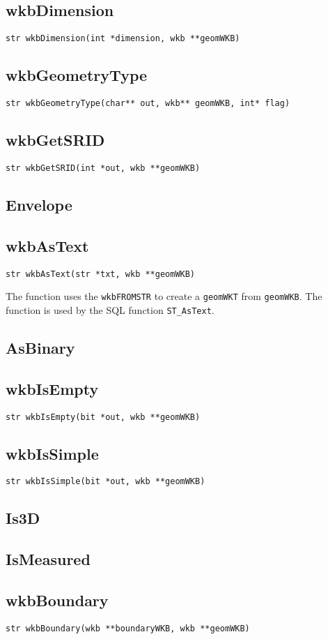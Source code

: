 \documentclass{article}
\begin{document}
\subsection{wkbDimension}

{\tt str wkbDimension(int *dimension, wkb **geomWKB)}

\subsection{wkbGeometryType}

{\tt str wkbGeometryType(char** out, wkb** geomWKB, int* flag)}

\subsection{wkbGetSRID}

{\tt str wkbGetSRID(int *out, wkb **geomWKB)}

\subsection{Envelope}

\subsection{wkbAsText}

{\tt str wkbAsText(str *txt, wkb **geomWKB)}

\vspace{10pt}
\noindent
The function uses the {\tt wkbFROMSTR} to create a {\tt geomWKT} from {\tt geomWKB}.
The function is used by the SQL function {\tt ST\_AsText}.

\subsection{AsBinary}

\subsection{wkbIsEmpty}

{\tt str wkbIsEmpty(bit *out, wkb **geomWKB)}

\subsection{wkbIsSimple}

{\tt str wkbIsSimple(bit *out, wkb **geomWKB)}

\subsection{Is3D}

\subsection{IsMeasured}

\subsection{wkbBoundary}

{\tt str wkbBoundary(wkb **boundaryWKB, wkb **geomWKB)}
\end{document}
